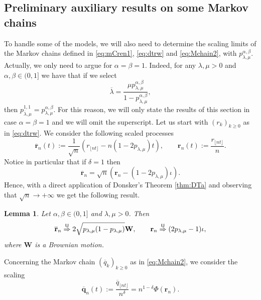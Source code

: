 \documentclass[]{amsart}
\numberwithin{equation}{section}
\newtheorem{lem}[thm]{Lemma}
\theoremstyle{remark}
\theoremstyle{definition}
\begin{document}
\subsection{Preliminary auxiliary results on some Markov chains}\label{subsecMC}
To handle some of the models, we will also need to determine the scaling limits of the Markov chains defined in \eqref{eq:mCren1}, \eqref{eq:dtrw} and \eqref{eq:Mchain2}, with $p_{\lambda,\mu}^{\alpha,\beta}$. Actually, we only need to argue for $\alpha=\beta=1$. Indeed, for any $\lambda,\mu>0$ and $\alpha,\beta \in (0,1]$ we have that if we select
\begin{equation}\label{eq:lambdabar}
	\overline{\lambda}=\frac{\mu p_{\lambda,\mu}^{\alpha,\beta}}{1-p_{\lambda,\mu}^{\alpha,\beta}},
\end{equation}
then $p_{\overline{\lambda},\mu}^{1,1}=p_{\lambda,\mu}^{\alpha,\beta}$. For this reason, we will only state the results of this section in case $\alpha=\beta=1$ and we will omit the superscript. Let us start with $(r_k)_{k \ge 0}$ as in \eqref{eq:dtrw}. We consider the following scaled processes
\begin{equation*}
	\overline{\mathbf{r}}_n(t):=\frac{1}{\sqrt{n}}(r_{\lfloor nt \rfloor}-n(1-2p_{\lambda,\mu})t), \qquad \mathbf{r}_n(t):=\frac{r_{\lfloor nt \rfloor}}{n}.
\end{equation*}
Notice in particular that if $\delta=1$ then
\begin{equation*}
	\overline{\mathbf{r}}_n=\sqrt{n}(\mathbf{r}_n-(1-2p_{\lambda,\mu})\iota).
\end{equation*}
Hence, with a direct application of Donsker's Theorem \ref{thm:DTa} and observing that $\sqrt{n} \to +\infty$ we get the following result.
\begin{lem}\label{lem:rn}
	Let $\alpha,\beta \in (0,1]$ and $\lambda,\mu>0$. Then
	\begin{equation*}
		\overline{\mathbf{r}}_n \overset{\sf U}{\Rightarrow} 	2\sqrt{p_{\lambda,\mu}(1-p_{\lambda,\mu})}\mathbf{W}, \qquad \mathbf{r}_n \overset{\sf U}{\Rightarrow} (2p_{\lambda,\mu}-1)\iota,
	\end{equation*}
	where $\mathbf{W}$ is a Brownian motion.
\end{lem}
Concerning the Markov chain $(\overline{q}_k)_{k \ge 0}$ as in \eqref{eq:Mchain2}, we consider the scaling
\begin{equation}\label{eq:scalingoq}
	\mathbf{\overline{q}}_n(t):=\frac{\overline{q}_{\lfloor nt\rfloor}}{n^\delta}=n^{1-\delta}\Phi(\mathbf{r}_n).
\end{equation}
\end{document}
